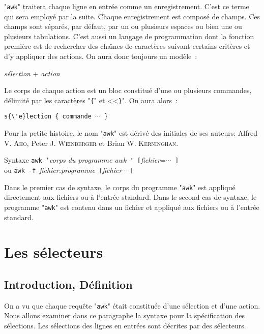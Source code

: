 "\texttt{awk}" traitera chaque ligne en entr{\'e}e comme un
enregistrement. C'est ce terme qui sera
employ{\'e} par la suite. Chaque enregistrement est compos{\'e} de champs. Ces
champs sont s{\'e}par{\'e}s, par d{\'e}faut, par un
ou plusieurs espaces ou bien une ou plusieurs tabulations. C'est aussi un langage
de programmation dont la fonction premi{\`e}re est de rechercher des cha{\^\i}nes
de caract{\`e}res suivant certains crit{\`e}res et d'y appliquer des actions. On
aura donc toujours un mod{\`e}le~: \centerline{\textsl{s{\'e}lection} +
\textsl{action}}

Le corps de chaque action est un bloc constitu{\'e} d'une ou plusieurs commandes,
d{\'e}limit{\'e} par les caract{\`e}res "\verb={=" et <<\verb=}=". On aura
alors~:
\begin{center}
\verb=s{\'e}lection { commande =$\cdots$\verb= }=
\end{center}

Pour la petite histoire, le nom "\texttt{awk}" est d{\'e}riv{\'e} des initiales de
ses auteurs: Alfred V. \textsc{Aho}, Peter J. \textsc{Weinberger} et Brian W.
\textsc{Kerninghan}.

\begin{definition}{Syntaxe}
\texttt{awk '}\textsl{corps du programme awk}\verb= ' [=\textsl{fichier}=$\cdots$\verb= ]=\\
ou
\texttt{awk -f }\textsl{fichier.programme}\verb= [=\textsl{fichier} $\cdots$\verb=]=
\end{definition}

Dans le premier cas de syntaxe, le corps du programme "\texttt{awk}"
est appliqu{\'e} directement aux fichiers ou {\`a} l'entr{\'e}e standard. Dans le
second cas de syntaxe, le programme "\texttt{awk}" est contenu dans un
fichier et appliqu{\'e} aux fichiers ou {\`a} l'entr{\'e}e standard.

\section{Les s{\'e}lecteurs}

\subsection{Introduction, D{\'e}finition}

On a vu que chaque requ{\^e}te "\texttt{awk}" {\'e}tait constitu{\'e}e d'une
s{\'e}lection et d'une action. Nous allons examiner dans ce paragraphe la
syntaxe pour la sp{\'e}cification des s{\'e}lections. Les s{\'e}lections des lignes
en entr{\'e}es sont d{\'e}crites par des s{\'e}lecteurs.

